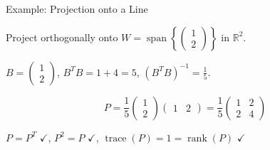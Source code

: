 \documentclass[10pt]{beamer}
\theoremstyle{definition}
\begin{document}
\begin{frame}{Example: Projection onto a Line}

Project orthogonally onto $W = \operatorname{span}\left\{\begin{pmatrix} 1 \\ 2 \end{pmatrix}\right\}$ in $\mathbb{R}^2$.

\vspace{0.3em}

$B = \begin{pmatrix} 1 \\ 2 \end{pmatrix}$, \quad $B^TB = 1 + 4 = 5$, \quad $(B^TB)^{-1} = \frac{1}{5}$.

\vspace{0.5em}

$$P = \frac{1}{5}\begin{pmatrix} 1 \\ 2 \end{pmatrix}\begin{pmatrix} 1 & 2 \end{pmatrix} = \frac{1}{5}\begin{pmatrix} 1 & 2 \\ 2 & 4 \end{pmatrix}$$

\vspace{0.5em}

$P = P^T$ $\checkmark$, \quad $P^2 = P$ $\checkmark$, \quad $\operatorname{trace}(P) = 1 = \operatorname{rank}(P)$ $\checkmark$

\end{frame}
\end{document}
